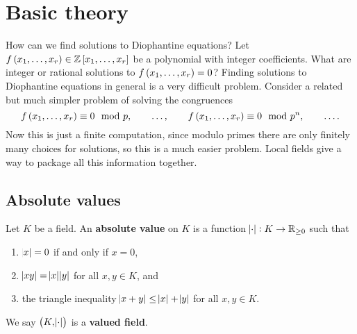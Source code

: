 \def\module{Local Fields}
\def\lecturer{Dr Rong Zhou}
\def\term{Michaelmas 2020}
\def\cover{}
\def\syllabus{}
\def\thm{subsection}



\newcommand{\pp}{\mathfrak{P}}





\setcounter{section}{0}

\section{Basic theory}


How can we find solutions to Diophantine equations? Let $ f\br{x_1, \dots, x_r} \in \ZZ\sbr{x_1, \dots, x_r} $ be a polynomial with integer coefficients. What are integer or rational solutions to $ f\br{x_1, \dots, x_r} = 0 $? Finding solutions to Diophantine equations in general is a very difficult problem. Consider a related but much simpler problem of solving the congruences
$$ f\br{x_1, \dots, x_r} \equiv 0 \mod p, \qquad \dots, \qquad f\br{x_1, \dots, x_r} \equiv 0 \mod p^n, \qquad \dots. $$
Now this is just a finite computation, since modulo primes there are only finitely many choices for solutions, so this is a much easier problem. Local fields give a way to package all this information together.

\subsection{Absolute values}

\begin{definition}
Let $ K $ be a field. An \textbf{absolute value} on $ K $ is a function $ \abs{\cdot} : K \to \mathbb{R}_{\ge 0} $ such that
\begin{enumerate}
\item $ \abs{x} = 0 $ if and only if $ x = 0 $,
\item $ \abs{xy} = \abs{x}\abs{y} $ for all $ x, y \in K $, and
\item the triangle inequality $ \abs{x + y} \le \abs{x} + \abs{y} $ for all $ x, y \in K $.
\end{enumerate}
We say $ \br{K, \abs{\cdot}} $ is a \textbf{valued field}.
\end{definition}

